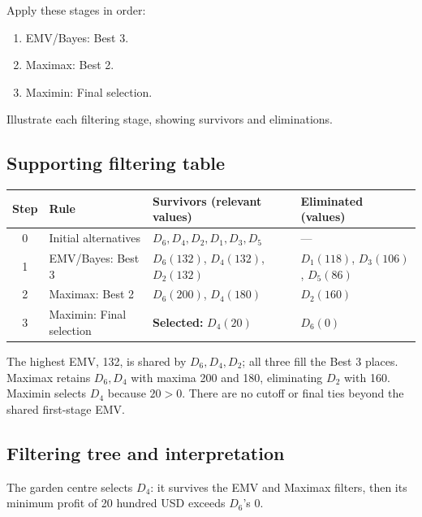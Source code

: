 Apply these stages in order:
\begin{enumerate}[leftmargin=*]
	\item EMV/Bayes: Best 3.
	\item Maximax: Best 2.
	\item Maximin: Final selection.
\end{enumerate}
Illustrate each filtering stage, showing survivors and eliminations.
\label{sol:q3table}
\subsection*{Supporting filtering table}
\begin{center}\small
\begin{tabularx}{\textwidth}{@{}c >{\raggedright\arraybackslash}p{} >{\raggedright\arraybackslash}X >{\raggedright\arraybackslash}p{}@{}}
\toprule
Step & Rule & Survivors (relevant values) & Eliminated (values)\\\midrule
0 & Initial alternatives & $D_6,D_4,D_2,D_1,D_3,D_5$ & ---\\
1 & EMV/Bayes: Best 3 & $D_6(132)$, $D_4(132)$, $D_2(132)$ & $D_1(118)$, $D_3(106)$, $D_5(86)$\\
2 & Maximax: Best 2 & $D_6(200)$, $D_4(180)$ & $D_2(160)$\\
3 & Maximin: Final selection & \textbf{Selected:} $D_4(20)$ & $D_6(0)$\\
\bottomrule\end{tabularx}
\end{center}
The highest EMV, 132, is shared by $D_6,D_4,D_2$; all three fill the Best 3 places. Maximax retains $D_6,D_4$ with maxima 200 and 180, eliminating $D_2$ with 160. Maximin selects $D_4$ because $20>0$. There are no cutoff or final ties beyond the shared first-stage EMV.
\secInicio[sec:q3]
\clearpage
{}\label{sol:q3tree}
\subsection*{Filtering tree and interpretation}
\begin{center}
\end{center}
The garden centre selects $D_4$: it survives the EMV and Maximax filters, then its minimum profit of 20 hundred USD exceeds $D_6$'s 0.
\secInicio[sec:q3]


